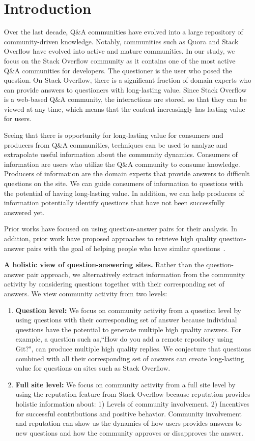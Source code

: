 \section{Introduction} Over the last decade, Q\&A communities have evolved into a large repository of community-driven knowledge. Notably, communities such as Quora and Stack Overflow have evolved into active and mature communities. In our study, we focus on the Stack Overflow community as it contains one of the most active Q\&A communities for developers. The questioner is the user who posed the question. On Stack Overflow, there is a significant fraction of domain experts who can provide answers to questioners with long-lasting value. Since Stack Overflow is a web-based Q\&A community, the interactions are stored, so that they can be viewed at any time, which means that the content increasingly has lasting value for users. 


Seeing that there is opportunity for long-lasting value for consumers and producers from Q\&A communities, techniques can be used to analyze and extrapolate useful information about the community dynamics. Consumers of information are users who utilize the Q\&A community to consume knowledge. Producers of information are the domain experts that provide answers to difficult questions on the site. We can guide consumers of information to questions with the potential of having long-lasting value. In addition, we can help producers of information potentially identify questions that have not been successfully answered yet.


Prior works have focused on using question-answer pairs for their analysis. In addition, prior work have proposed approaches to retrieve high quality question-answer pairs with the goal of helping people who have similar questions~\cite{}.


\noindent\textbf{A holistic view of question-answering sites.} Rather than the question-answer pair approach, we alternatively extract information from the community activity by considering questions together with their corresponding set of answers. We view community activity from two levels: 
\begin{enumerate} 
\item \textbf{Question level:} We focus on community activity from a question level by using questions with their corresponding set of answer because individual questions have the potential to generate multiple high quality answers. For example, a question such as,``How do you add a remote repository using Git?", can produce multiple high quality replies. We conjecture that questions combined with all their corresponding set of answers can create long-lasting value for questions on sites such as Stack Overflow.
\item \textbf{Full site level:} We focus on community activity from a full site level by using the reputation feature from Stack Overflow because reputation provides holistic information about: 1) Levels of community involvement. 2) Incentives for successful contributions and positive behavior. Community involvement and reputation can show us the dynamics of how users provides answers to new questions and how the community approves or disapproves the answer.
\end{enumerate}



